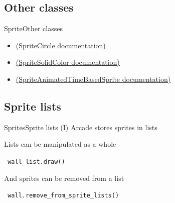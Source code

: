 \documentclass[10pt,compress]{beamer} %
\begin{document}
\subsection{Other classes}

\begin{frame}[fragile]{Sprite}{Other classes}
	\begin{itemize}
		\item \href{https://api.arcade.academy/en/latest/api/sprites.html#arcade-spritecircle}{(SpriteCircle documentation)}
		\item \href{https://api.arcade.academy/en/latest/api/sprites.html#arcade-spritesolidcolor}{(SpriteSolidColor documentation)}
		\item \href{https://api.arcade.academy/en/latest/api/sprites.html#arcade-spriteanimatedtimebasedsprite}{(SpriteAnimatedTimeBasedSprite documentation)}
	\end{itemize}
\end{frame}

\subsection{Sprite lists}

\begin{frame}{Sprites}{Sprite lists (I)}
	Arcade stores sprites in lists
    
	\begin{exampleblock}{}
	
	\end{exampleblock}

       Lists can be manipulated as a whole

	\begin{exampleblock}{}
        \texttt{
        wall\_list.draw()
        }
	\end{exampleblock}

    	And sprites can be removed from a list
	\begin{exampleblock}{}
        \texttt{
        wall.remove\_from\_sprite\_lists()
        }
	\end{exampleblock}
\end{frame}
\end{document}
